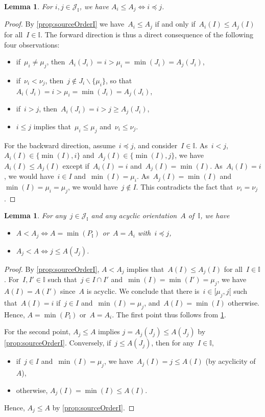 \documentclass{amsart}
\newtheorem{lemma}[theorem]{Lemma}
\theoremstyle{definition}
\newcommand{\cal}[1]{\mathcal{#1}} %
\newcommand{\ssm}{\smallsetminus} %
\newcommand{\II}{\mathbb I} %
\newcommand{\cJ}{\cal{J}} %
\begin{document}
\begin{lemma}
\label{lem:irrorder}
For $i,j \in \cJ_\II$, we have $A_i \le A_j \iff i \preccurlyeq j$.
\end{lemma}

\begin{proof}
By \cref{prop:sourceOrderI} we have~$A_i \le A_j$ if and only if~$A_i(I) \le A_j(I)$ for all~$I \in \II$.
%
The forward direction is thus a direct consequence of the following four observations:
\begin{itemize}
\item if~$\mu_i \ne \mu_j$, then~$A_i(J_i) = i > \mu_i = \min(J_i) = A_j(J_i)$,
\item if~$\nu_i < \nu_j$, then~$j \notin J_i \ssm \{\mu_i\}$, so that~$A_i(J_i) = i > \mu_i = \min(J_i) = A_j(J_i)$,
\item if~$i > j$, then~$A_i(J_i) = i > j \ge A_j(J_i)$,
\item $i \le j$ implies that~$\mu_i \le \mu_j$ and~$\nu_i \le \nu_j$.
\end{itemize}
%
For the backward direction, assume~$i \preccurlyeq j $, and consider~$I \in \II$.
As~$i < j$, $A_i(I) \in \{\min(I), i\}$ and~$A_j(I) \in \{\min(I), j\}$, we have~$A_i(I) \le A_j(I)$ except if~$A_i(I) = i$ and~$A_j(I) = \min(I)$.
As~$A_i(I) = i$, we would have~$i \in I$ and~$\min(I) = \mu_i$. As~$A_j(I) = \min(I)$ and~$\min(I) = \mu_i = \mu_j$, we would have~$j \notin I$.
This contradicts the fact that~$\nu_i = \nu_j$.
\end{proof}

\begin{lemma}
\label{lem:subirr}
For any~$j \in \cJ_\II$ and any acyclic orientation~$A$ of~$\II$, we have
\begin{itemize}
\item $A < A_j \iff A = \min(P_\II)$ or~$A = A_i$ with~$i \preccurlyeq j$,
\item $A_j < A \iff j \le A(J_j)$.
\end{itemize}
\end{lemma}

\begin{proof}
By \cref{prop:sourceOrderI}, $A < A_j$ implies that~$A(I) \le A_j(I)$ for all~$I \in \II$.
For~$I, I' \in \II$ such that~$j \in I \cap I'$ and~$\min(I) = \min(I') = \mu_j$, we have~$A(I) = A(I')$ since~$A$ is acyclic.
We conclude that there is~$i \in {[\mu_j, j[}$ such that~$A(I) = i$ if~$j \in I$ and~$\min(I) = \mu_j$, and~$A(I) = \min(I)$ otherwise.
Hence, $A = \min(P_\II)$ or~$A = A_i$.
The first point thus follows from \cref{lem:irrorder}.

For the second point, $A_j \le A$ implies $j = A_j(J_j) \le A(J_j)$ by \cref{prop:sourceOrderI}.
Conversely, if~$j \le A(J_j)$, then for any~$I \in \II$,
\begin{itemize}
\item if~$j \in I$ and~$\min(I) = \mu_j$, we have~$A_j(I) = j \le A(I)$ (by acyclicity of~$A$),
\item otherwise, $A_j(I) = \min(I) \le A(I)$.
\end{itemize}
Hence, $A_j \le A$ by \cref{prop:sourceOrderI}.
\end{proof}
\end{document}
